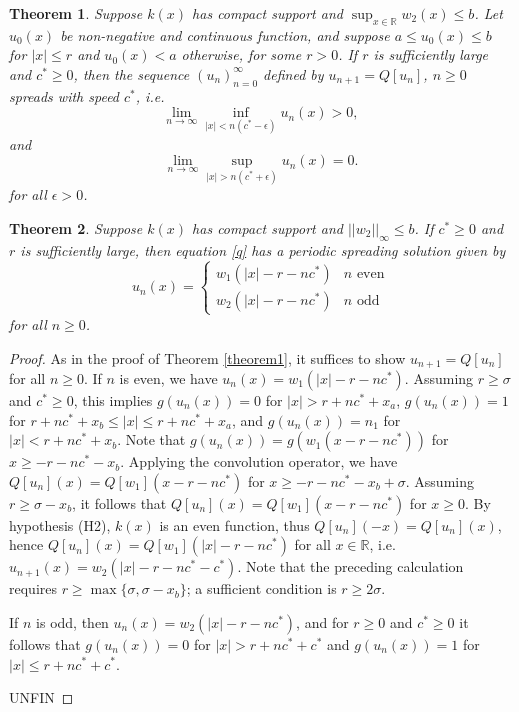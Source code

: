 \documentclass[11pt]{article}
\newtheorem{thm}{Theorem}
\theoremstyle{definition}
\numberwithin{equation}{section}
\numberwithin{thm}{section}
\renewcommand{\a}{a}
\renewcommand{\b}{b}
\newcommand{\m}{n_1}
\begin{document}
\begin{thm} Suppose $k(x)$ has compact support and $\sup_{x\in\mathbb R}w_2(x)\leq \b$. Let $u_0(x)$ be non-negative and continuous function, and suppose $\a \leq u_0(x) \leq \b$ for $|x| \leq r$ and $u_0(x) < \a$ otherwise, for some $r > 0$. If $r$ is sufficiently large and $c^* \geq 0$, then the sequence $(u_n)_{n=0}^{\infty}$ defined by $u_{n+1}=Q[u_n]$, $n\geq 0$ spreads with speed $c^*$, i.e.
\begin{equation}
\lim_{n\to\infty}\inf_{|x|<n(c^*-\epsilon)}u_{n}(x)>0,
\end{equation}
and 
\begin{equation}
\lim_{n\to\infty}\sup_{|x|>n(c^*+\epsilon)}u_n(x)=0.
\end{equation}
for all $\epsilon>0$.
\end{thm}

\begin{thm} Suppose $k(x)$ has compact support and $||w_2||_\infty \leq \b$. If $c^* \geq 0$ and $r$ is sufficiently large, then equation \eqref{q} has a periodic spreading solution given by
\begin{equation} \label{compactptw}
u_n(x) = \begin{cases}
w_1(|x|-r-nc^*) & n \text{ even} \\
w_2(|x|-r-nc^*) & n \text{ odd}
\end{cases}
\end{equation}
for all $n\geq 0$.
\end{thm}

\begin{proof}
As in the proof of Theorem \ref{theorem1}, it suffices to show $u_{n+1}=Q[u_n]$ for all $n\geq 0$. If $n$ is even, we have $u_n(x)=w_1(|x|-r-nc^*)$. Assuming $r \geq \sigma$ and $c^* \geq 0$, this implies $g(u_n(x)) = 0$ for $|x| > r+nc^*+x_\a$, $g(u_n(x))=1$ for $r+nc^*+x_\b\leq |x|\leq r+nc^*+x_\a$, and $g(u_n(x))=\m$ for $|x|<r+nc^*+x_\b$. Note that $g(u_n(x)) = g(w_1(x-r-nc^*))$ for $x \geq -r-nc^*-x_\b$. Applying the convolution operator, we have $Q[u_n](x) = Q[w_1](x-r-nc^*)$ for $x \geq -r-nc^*-x_\b+\sigma$. Assuming $r \geq \sigma - x_\b$, it follows that $Q[u_n](x) = Q[w_1](x-r-nc^*)$ for $x \geq 0$. By hypothesis (H2), $k(x)$ is an even function, thus $Q[u_n](-x) = Q[u_n](x)$, hence $Q[u_n](x) = Q[w_1](|x|-r-nc^*)$ for all $x \in \mathbb R$, i.e. $u_{n+1}(x) = w_2(|x|-r-nc^*-c^*)$. Note that the preceding calculation requires $r \geq \max\{\sigma,\sigma-x_\b\}$; a sufficient condition is $r \geq 2\sigma$.

If $n$ is odd, then $u_n(x)=w_2(|x|-r-nc^*)$, and for $r\geq0$ and $c^*\geq 0$ it follows that $g(u_n(x)) = 0$ for $|x| > r+nc^*+c^*$ and $g(u_n(x))=1$ for $|x| \leq r+nc^*+c^*$.

UNFIN
\end{proof}
\end{document}
